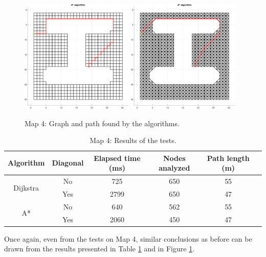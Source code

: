 \begin{figure}[H]
    \includegraphics[width=0.48\textwidth]{./img/MATLAB/04_astar_orthogonal.pdf}
    \hspace{6pt}
    \includegraphics[width=0.48\textwidth]{./img/MATLAB/04_astar_diagonal.pdf}
    \caption{Map 4: Graph and path found by the algorithms.}
    \label{fig:map_4_results}
\end{figure}

\begin{table}[H]
    \centering
    \begin{tabular}{|c|c|c|c|c|c|}
        \hline
        \textbf{Algorithm}        & \textbf{Diagonal} & \textbf{Elapsed time (ms)} & \textbf{Nodes analyzed} & \textbf{Path length (m)} \\
        \hline
        \multirow{2}{*}{Dijkstra} & No                & 725                        & 650                     & 55                       \\
                                  & Yes               & 2799                       & 650                     & 47                       \\
        \hline
        \multirow{2}{*}{A*}       & No                & 640                        & 562                     & 55                       \\
                                  & Yes               & 2060                       & 450                     & 47                       \\
        \hline
    \end{tabular}
    \caption{Map 4: Results of the tests.}
    \label{tab:map_4_results}
\end{table}

Once again, even from the tests on Map 4, similar conclusions as before can be drawn from the results presented in Table \ref{tab:map_4_results} and in Figure \ref{fig:map_4_results}.

